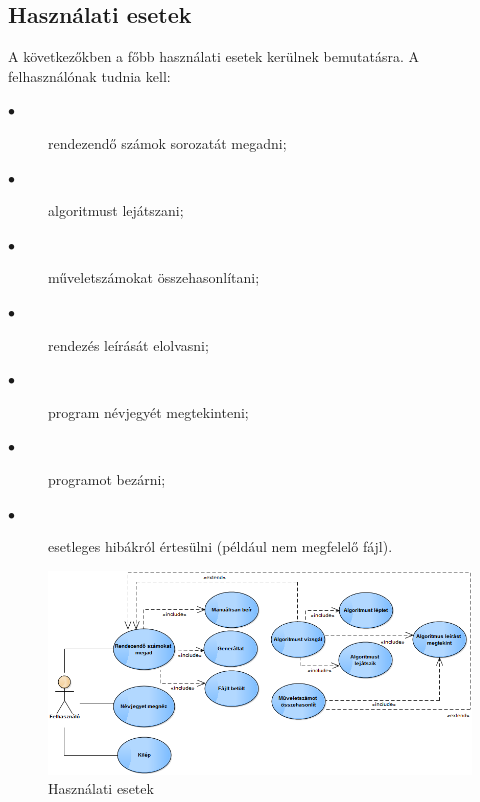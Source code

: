\documentclass{elteikthesis}
\begin{document}
\subsection{Használati esetek}
A következőkben a főbb használati esetek kerülnek bemutatásra. A felhasználónak tudnia kell:\par
\begin{description}
	\item[$\bullet$] rendezendő számok sorozatát megadni;
	\item[$\bullet$] algoritmust lejátszani;
	\item[$\bullet$] műveletszámokat összehasonlítani;
	\item[$\bullet$] rendezés leírását elolvasni;
	\item[$\bullet$] program névjegyét megtekinteni;
	\item[$\bullet$] programot bezárni;
	\item[$\bullet$] esetleges hibákról értesülni (például nem megfelelő fájl).
\end{description}
\begin{figure}[H]
	\centering
	\includegraphics[width=\textwidth]{pics/usecase.png}
	\caption{Használati esetek}
\end{figure}
\end{document}
